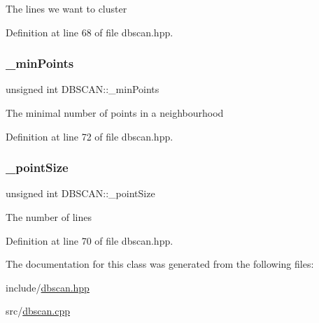 The lines we want to cluster 

Definition at line 68 of file dbscan.\+hpp.

\mbox{\label{class_d_b_s_c_a_n_a5bd2e6ab5316035d7b5448d00f4108e5}} 
\subsubsection{\texorpdfstring{\+\_\+min\+Points}{\_minPoints}}
{\footnotesize\ttfamily unsigned int D\+B\+S\+C\+A\+N\+::\+\_\+min\+Points\hspace{0.3cm}{\ttfamily [private]}}

The minimal number of points in a neighbourhood 

Definition at line 72 of file dbscan.\+hpp.

\mbox{\label{class_d_b_s_c_a_n_af45306ee35215b8c0be32b04f176d49d}} 
\subsubsection{\texorpdfstring{\+\_\+point\+Size}{\_pointSize}}
{\footnotesize\ttfamily unsigned int D\+B\+S\+C\+A\+N\+::\+\_\+point\+Size\hspace{0.3cm}{\ttfamily [private]}}

The number of lines 

Definition at line 70 of file dbscan.\+hpp.



The documentation for this class was generated from the following files\+:\begin{DoxyCompactItemize}
\item 
include/\hyperlink{dbscan_8hpp}{dbscan.\+hpp}\item 
src/\hyperlink{dbscan_8cpp}{dbscan.\+cpp}\end{DoxyCompactItemize}
